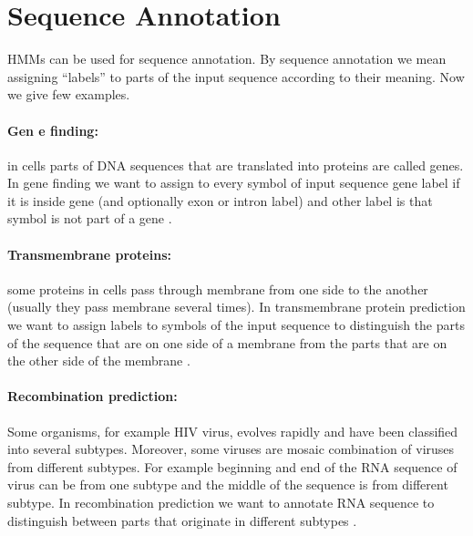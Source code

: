 \section{Sequence Annotation}


HMMs can be used for sequence annotation. By sequence annotation we mean
assigning ``labels'' to parts of the input sequence according to their meaning.
Now we give few examples.

\paragraph{Gen e finding:} in cells parts of DNA sequences that are translated
into proteins are called genes.  In gene finding we want to assign to every
symbol of input sequence gene label if it is inside gene (and optionally exon
or intron label) and other label is that symbol is not part of a gene
\cite{GeneWise2004,Brejova2005,Burge1997,Alexanderson2004}.


\paragraph{Transmembrane proteins:} some proteins in cells pass through membrane
from one side to the another (usually they pass membrane several times).  In
transmembrane protein prediction we want to assign labels to symbols of the input
sequence to distinguish the parts of the sequence that are on one side of a
membrane from the parts that are on the other side of the membrane 
\cite{Brown2010}.

\paragraph{Recombination prediction:} Some organisms, for example HIV virus,
evolves rapidly and have been classified into several subtypes.  Moreover,
some viruses are mosaic combination of viruses from different subtypes. For
example beginning and end of the RNA sequence of virus can be from one subtype and
the middle of the sequence is from different subtype. In recombination prediction
we want to annotate RNA sequence to distinguish between parts that originate in
different subtypes \cite{Nanasi2010,Truszkowski2011}.  

